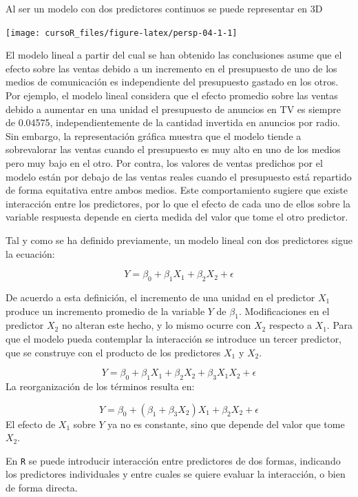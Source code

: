 \documentclass[]{book}
\begin{document}
Al ser un modelo con dos predictores continuos se puede representar en
3D

\begin{center}\texttt{[image: cursoR\_files/figure-latex/persp-04-1-1]} \end{center}

El modelo lineal a partir del cual se han obtenido las conclusiones
asume que el efecto sobre las ventas debido a un incremento en el
presupuesto de uno de los medios de comunicación es independiente del
presupuesto gastado en los otros. Por ejemplo, el modelo lineal
considera que el efecto promedio sobre las ventas debido a aumentar en
una unidad el presupuesto de anuncios en TV es siempre de 0.04575,
independientemente de la cantidad invertida en anuncios por radio. Sin
embargo, la representación gráfica muestra que el modelo tiende a
sobrevalorar las ventas cuando el presupuesto es muy alto en uno de los
medios pero muy bajo en el otro. Por contra, los valores de ventas
predichos por el modelo están por debajo de las ventas reales cuando el
presupuesto está repartido de forma equitativa entre ambos medios. Este
comportamiento sugiere que existe interacción entre los predictores, por
lo que el efecto de cada uno de ellos sobre la variable respuesta
depende en cierta medida del valor que tome el otro predictor.

Tal y como se ha definido previamente, un modelo lineal con dos
predictores sigue la ecuación:

\[
Y={\beta}_0+ \beta_1 X_1+ \beta_2 X_2+ \epsilon
\]

De acuerdo a esta definición, el incremento de una unidad en el
predictor \(X_1\) produce un incremento promedio de la variable \(Y\) de
\(\beta_1\). Modificaciones en el predictor \(X_2\) no alteran este
hecho, y lo mismo ocurre con \(X_2\) respecto a \(X_1\). Para que el
modelo pueda contemplar la interacción se introduce un tercer predictor,
que se construye con el producto de los predictores \(X_1\) y \(X_2\).

\[
Y=\beta_0+\beta_1 X_1+\beta_2 X_2+ \beta_3 X_1X_2+\epsilon
\] La reorganización de los términos resulta en:

\[
  Y=\beta_0+(\beta_1+\beta_3 X_2)X_1+\beta_2X_2+\epsilon
\] El efecto de \(X_1\) sobre \(Y\) ya no es constante, sino que depende
del valor que tome \(X_2\).

En \texttt{R} se puede introducir interacción entre predictores de dos
formas, indicando los predictores individuales y entre cuales se quiere
evaluar la interacción, o bien de forma directa.
\end{document}
